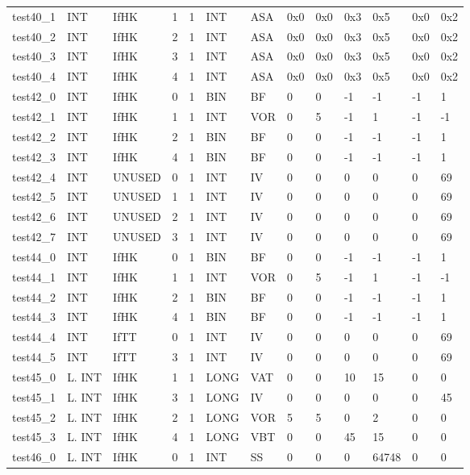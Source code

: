 \begin{longtable}{|l|l|l|p{0.5cm}|p{0.5cm}|l|p{0.5cm}|p{0.5cm}|p{0.5cm}|l|l|p{0.5cm}|l|}
test40\_1 & INT & IfHK & 1 & 1 & INT & ASA & 0x0 & 0x0 & 0x3 & 0x5 & 0x0 & 0x2 \\
test40\_2 & INT & IfHK & 2 & 1 & INT & ASA & 0x0 & 0x0 & 0x3 & 0x5 & 0x0 & 0x2 \\
test40\_3 & INT & IfHK & 3 & 1 & INT & ASA & 0x0 & 0x0 & 0x3 & 0x5 & 0x0 & 0x2 \\
test40\_4 & INT & IfHK & 4 & 1 & INT & ASA & 0x0 & 0x0 & 0x3 & 0x5 & 0x0 & 0x2 \\
test42\_0 & INT & IfHK & 0 & 1 & BIN & BF & 0 & 0 & -1 & -1 & -1 & 1 \\
test42\_1 & INT & IfHK & 1 & 1 & INT & VOR & 0 & 5 & -1 & 1 & -1 & -1 \\
test42\_2 & INT & IfHK & 2 & 1 & BIN & BF & 0 & 0 & -1 & -1 & -1 & 1 \\
test42\_3 & INT & IfHK & 4 & 1 & BIN & BF & 0 & 0 & -1 & -1 & -1 & 1 \\
test42\_4 & INT & UNUSED & 0 & 1 & INT & IV & 0 & 0 & 0 & 0 & 0 & 69 \\
test42\_5 & INT & UNUSED & 1 & 1 & INT & IV & 0 & 0 & 0 & 0 & 0 & 69 \\
test42\_6 & INT & UNUSED & 2 & 1 & INT & IV & 0 & 0 & 0 & 0 & 0 & 69 \\
test42\_7 & INT & UNUSED & 3 & 1 & INT & IV & 0 & 0 & 0 & 0 & 0 & 69 \\
test44\_0 & INT & IfHK & 0 & 1 & BIN & BF & 0 & 0 & -1 & -1 & -1 & 1 \\
test44\_1 & INT & IfHK & 1 & 1 & INT & VOR & 0 & 5 & -1 & 1 & -1 & -1 \\
test44\_2 & INT & IfHK & 2 & 1 & BIN & BF & 0 & 0 & -1 & -1 & -1 & 1 \\
test44\_3 & INT & IfHK & 4 & 1 & BIN & BF & 0 & 0 & -1 & -1 & -1 & 1 \\
test44\_4 & INT & IfTT & 0 & 1 & INT & IV & 0 & 0 & 0 & 0 & 0 & 69 \\
test44\_5 & INT & IfTT & 3 & 1 & INT & IV & 0 & 0 & 0 & 0 & 0 & 69 \\
test45\_0 & L. INT & IfHK & 1 & 1 & LONG & VAT & 0 & 0 & 10 & 15 & 0 & 0 \\
test45\_1 & L. INT & IfHK & 3 & 1 & LONG & IV & 0 & 0 & 0 & 0 & 0 & 45 \\
test45\_2 & L. INT & IfHK & 2 & 1 & LONG & VOR & 5 & 5 & 0 & 2 & 0 & 0 \\
test45\_3 & L. INT & IfHK & 4 & 1 & LONG & VBT & 0 & 0 & 45 & 15 & 0 & 0 \\
test46\_0 & L. INT & IfHK & 0 & 1 & INT & SS & 0 & 0 & 0 & 64748 & 0 & 0 \\

\end{longtable}
